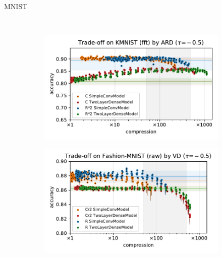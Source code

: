 \documentclass{beamer}
\begin{document}
\begin{frame}[c]{\insertsection}{MNIST}
\begin{figure}[t]
\begin{subfigure}[b]{0.5\columnwidth}
    \end{subfigure} \\ %
    \begin{subfigure}[b]{0.5\columnwidth}
      \centering
      \includegraphics[width=\linewidth]{figure__mnist-like__trade-off/appendix__cmp__ARD__kmnist__fft__-0.5.pdf}
    \end{subfigure}\hspace{-1em}%
    \begin{subfigure}[b]{0.5\columnwidth}
      \centering
      \includegraphics[width=\linewidth]{figure__mnist-like__trade-off/appendix__cmp__VD__fashionmnist__raw__-0.5.pdf}
    \end{subfigure}%
  \end{figure}

\end{frame}
\end{document}
